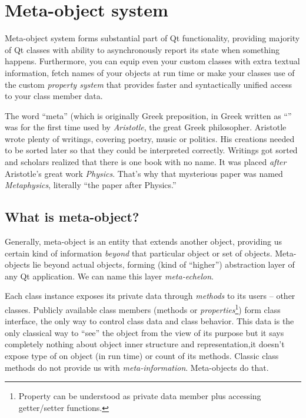 \chapter{Meta-object system}
Meta-object system forms substantial part of Qt functionality, providing majority of Qt classes with ability to asynchronously report its state when something happens. Furthermore, you can equip even your custom classes with extra textual information, fetch names of your objects at run time or make your classes use of the custom \textit{property system} that provides faster and syntactically unified access to your class member data.

\begin{fdocextra}
The word \enquote{meta} (which is originally Greek preposition, in Greek written as \enquote{\textmu \textepsilon \texttau \textalpha} was for the first time used by \textit{Aristotle}, the great Greek philosopher. Aristotle wrote plenty of writings, covering poetry, music or politics. His creations needed to be sorted later so that they could be interpreted correctly. Writings got sorted and scholars realized that there is one book with no name. It was placed \textit{after} Aristotle's great work \textit{Physics}. That's why that mysterious paper was named \textit{Metaphysics}, literally \enquote{the paper after Physics.}
\end{fdocextra}

\section{What is meta-object?}
Generally, meta-object is an entity that extends another object, providing us certain kind of information \textit{beyond} that particular object or set of objects. Meta-objects lie beyond actual objects, forming (kind of \enquote{higher}) abstraction layer of any Qt application. We can name this layer \textit{meta-echelon}.

Each class instance exposes its private data through \textit{methods} to its users -- other classes. Publicly available class members (methods or \textit{properties}\footnote{Property can be understood as private data member plus accessing getter/setter functions.}) form class interface, the only way to control class data and class behavior. This data is the only classical way to \enquote{see} the object from the view of its purpose but it says completely nothing about object inner structure and representation,\eg it doesn't expose type of on object (in run time) or count of its methods. Classic class methods do not provide us with \textit{meta-information}. Meta-objects do that.

